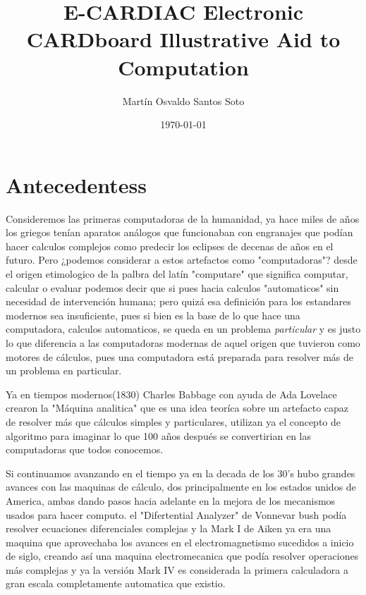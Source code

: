 \documentclass[12pt]{article}
\title{E-CARDIAC Electronic CARDboard Illustrative Aid to Computation}
\author{Martín Osvaldo Santos Soto}
\date{\today}
\begin{document}
	\maketitle
	
	\section{ Antecedentess }
	Consideremos las primeras computadoras de la humanidad, ya hace miles de años los griegos tenían aparatos análogos que funcionaban con engranajes
	que podían hacer calculos complejos como predecir los eclipses de decenas de años en el futuro. Pero ¿podemos considerar a estos artefactos como "computadoras"?
	desde el origen etimologico de la palbra del latín "computare" que significa computar, calcular o evaluar podemos decir que si pues hacia calculos "automaticos"
	sin necesidad de intervención humana; pero quizá esa definición para los estandares modernos sea insuficiente, pues si bien es la base de lo que hace
	una computadora, calculos automaticos, se queda en un problema \textit{particular} y es justo lo que diferencia a las computadoras modernas de aquel origen
	que tuvieron como motores de cálculos, pues una computadora está preparada para resolver más de un problema en particular.
	
	Ya en tiempos modernos(1830) Charles Babbage con ayuda de Ada Lovelace crearon la "Máquina analitica" que es una idea teoríca sobre un artefacto capaz
	de resolver más que cálculos simples y particulares, utilizan ya el concepto de algoritmo para imaginar lo que 100 años después se convertirian en las 
	computadoras que todos conocemos.
	
	Si continuamos avanzando en el tiempo ya en la decada de los 30's hubo grandes avances con las maquinas de cálculo, dos principalmente en los
	estados unidos de America, ambas dando pasos hacia adelante en la mejora de los mecanismos usados para hacer computo. el "Difertential Analyzer" de
	Vonnevar bush podía resolver ecuaciones diferenciales complejas y la Mark I de Aiken ya era una maquina que aprovechaba los avances en el electromagnetismo
	sucedidos a inicio de siglo, creando así una maquina electromecanica que podía resolver operaciones más complejas y ya la versión Mark IV es considerada
	la primera calculadora a gran escala completamente automatica que existio.
	
\end{document}
